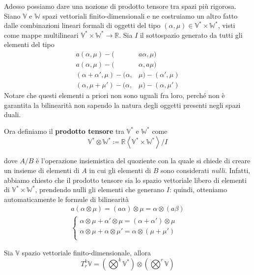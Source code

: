 Adesso possiamo dare una nozione di prodotto tensore tra spazi più rigorosa.
Siano $\mathbb{V}$ e $\mathbb{W}$ spazi vettoriali finito-dimensionali e ne costruiamo un altro fatto dalle combinazioni lineari formali di oggetti del tipo $(\alpha, \mu) \in \mathbb{V}^* \times \mathbb{W}^*$, visti come mappe multilineari $\mathbb{V}^* \times \mathbb{W}^* \longrightarrow \mathbb{R}$.
Sia $I$ il sottospazio generato da tutti gli elementi del tipo
\begin{align*}
    a(\alpha, \mu) - (                 & a \alpha, \mu)        \\
    a(\alpha, \mu) - (                 & \alpha, a \mu)        \\
    (\alpha + \alpha', \mu) - (\alpha, & \mu) - (\alpha', \mu) \\
    (\alpha, \mu + \mu') - (\alpha,    & \mu) - (\alpha, \mu')
\end{align*}
Notare che questi elementi a priori non sono uguali fra loro, perché non è garantita la bilinearità non sapendo la natura degli oggetti presenti negli spazi duali.
\begin{definition}
    Ora definiamo il \textbf{prodotto tensore} tra $\mathbb{V}^*$ e $\mathbb{W}^*$ come
    \begin{equation}
        \mathbb{V}^* \otimes \mathbb{W}^* \coloneqq \mathbb{R}\left \langle \mathbb{V}^* \times \mathbb{W}^* \right \rangle / I
    \end{equation}
\end{definition}
dove $A/B$ è l'operazione insiemistica del quoziente con la quale si chiede di creare un insieme di elementi di $A$ in cui gli elementi di $B$ sono considerati \emph{nulli}.
Infatti, abbiamo chiesto che il prodotto tensore sia lo spazio vettoriale libero di elementi di $\mathbb{V}^* \times \mathbb{W}^*$, prendendo nulli gli elementi che generano $I$: quindi, otteniamo automaticamente le formule di bilinearità
\begin{align}
    a(\alpha \otimes \mu) = (a \alpha) \otimes \mu = \alpha \otimes (a \beta) \\
    \begin{cases}
        \alpha \otimes \mu + \alpha' \otimes \mu = (\alpha + \alpha') \otimes \mu \\
        \alpha \otimes \mu + \alpha \otimes \mu' = \alpha \otimes (\mu + \mu')    \\
    \end{cases}
\end{align}
\begin{corollary}
    Sia $\mathbb{V}$ spazio vettoriale finito-dimensionale, allora
    \[
        T^k_r \mathbb{V} = \left(\bigotimes^k \mathbb{V}^*\right) \otimes \left(\bigotimes^r \mathbb{V}\right)
    \]
\end{corollary}
